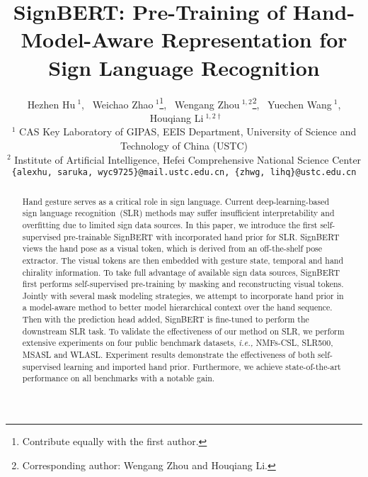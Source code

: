 \documentclass[10pt,twocolumn,letterpaper]{article}
\begin{document}
\title{SignBERT: Pre-Training of Hand-Model-Aware Representation for Sign Language Recognition}

\author{Hezhen Hu{\small $~^{1}$}, ~Weichao Zhao{\small $~^{1}$}\thanks{Contribute equally with the first author.}, ~Wengang Zhou{\small $~^{1,2}$}\thanks{Corresponding author: Wengang Zhou and Houqiang Li.}, ~Yuechen Wang{\small $~^{1}$}, ~Houqiang Li{\small $~^{1,2\dag}$}\\
\normalsize
$^{1}$ CAS Key Laboratory of GIPAS, EEIS Department, University of Science and Technology of China (USTC) \\
\normalsize
$^{2}$ Institute of Artificial Intelligence, Hefei Comprehensive National Science Center\\

\normalsize
{\tt\small \{alexhu, saruka, wyc9725\}@mail.ustc.edu.cn, \{zhwg, lihq\}@ustc.edu.cn}
}



\maketitle
\ificcvfinal\thispagestyle{empty}\fi

\begin{abstract}
Hand gesture serves as a critical role in sign language.
Current deep-learning-based sign language recognition~(SLR) methods may suffer insufficient interpretability and overfitting due to limited sign data sources.
In this paper, we introduce the first self-supervised pre-trainable SignBERT with incorporated hand prior for SLR.
SignBERT views the hand pose as a visual token, which is derived from an off-the-shelf pose extractor.
The visual tokens are then embedded with gesture state, temporal and hand chirality information.
To take full advantage of available sign data sources, SignBERT first performs self-supervised pre-training by masking and reconstructing visual tokens.
Jointly with several mask modeling strategies, we attempt to incorporate hand prior in a model-aware method to better model hierarchical context over the hand sequence.
Then with the prediction head added, SignBERT is fine-tuned to perform the downstream SLR task.
To validate the effectiveness of our method on SLR, we perform extensive experiments on four public benchmark datasets, \emph{i.e.,} NMFs-CSL, SLR500, MSASL and WLASL.
Experiment results demonstrate the effectiveness of both self-supervised learning and imported hand prior.
Furthermore, we achieve state-of-the-art performance on all benchmarks with a notable gain.
\vspace{-0.3cm}
\end{abstract}
\end{document}
